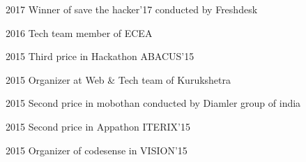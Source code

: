 
\begin{cvachievements}
  \cvachievement
    {2017} %
    {Winner of save the hacker'17 conducted by Freshdesk} %

  \cvachievement
    {2016} %
    {Tech team member of ECEA} %

  \cvachievement
    {2015} %
    {Third price in Hackathon ABACUS'15} %

  \cvachievement
    {2015} %
    {Organizer at Web \& Tech team of Kurukshetra} %

  \cvachievement
    {2015} %
    {Second price in mobothan conducted by Diamler group of india} %

  \cvachievement
    {2015} %
    {Second price in Appathon ITERIX'15} %

  \cvachievement
    {2015} %
    {Organizer of codesense in VISION'15} %

\end{cvachievements}
